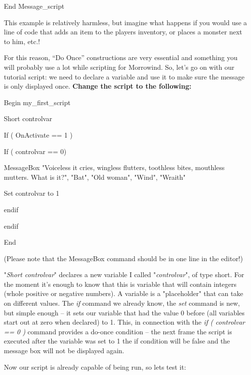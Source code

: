 \documentclass[
]{article}
\begin{document}
End Message\_script

This example is relatively harmless, but imagine what happens if you
would use a line of code that adds an item to the players inventory, or
places a monster next to him, etc.!

For this reason, ``Do Once'' constructions are very essential and
something you will probably use a lot while scripting for Morrowind. So,
let's go on with our tutorial script: we need to declare a variable and
use it to make sure the message is only displayed once. \textbf{Change
the script to the following:}

Begin my\_first\_script

Short controlvar

If ( OnActivate == 1 )

If ( controlvar == 0)

MessageBox "Voiceless it cries, wingless flutters, toothless bites,
mouthless mutters. What is it?", "Bat", "Old woman", "Wind", "Wraith"

Set controlvar to 1

endif

endif

End

(Please note that the MessageBox command should be in one line in the
editor!)

"\emph{Short controlvar}" declares a new variable I called
"\emph{controlvar}", of type short. For the moment it's enough to know
that this is variable that will contain integers (whole positive or
negative numbers). A variable is a "placeholder" that can take on
different values. The \emph{if} command we already know, the \emph{set}
command is new, but simple enough -- it sets our variable that had the
value 0 before (all variables start out at zero when declared) to 1.
This, in connection with the \emph{if ( controlvar == 0 )} command
provides a do-once condition -- the next frame the script is executed
after the variable was set to 1 the if condition will be false and the
message box will not be displayed again.

Now our script is already capable of being run, so lets test it:
\end{document}
